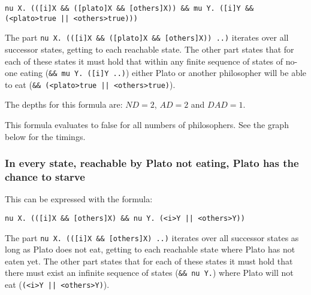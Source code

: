 \documentclass[10pt,a4paper]{article}
\begin{document}
\begin{center}
	\tt nu X. (([i]X \&\& ([plato]X \&\& [others]X)) \&\& mu Y. ([i]Y \&\& (<plato>true || <others>true)))
\end{center}	
	
The part {\tt nu X. (([i]X \&\& ([plato]X \&\& [others]X)) ..)} iterates over all successor states, getting to each reachable state. The other part states that for each of these states it must hold that within any finite sequence of states of no-one eating ({\tt \&\& mu Y. ([i]Y ..)}) either Plato or another philosopher will be able to eat ({\tt \&\& (<plato>true || <others>true)}).

The depths for this formula are: $ND = 2$, $AD = 2$ and $DAD = 1$.

This formula evaluates to false for all numbers of philosophers. See the graph below for the timings.


\subsubsection{In every state, reachable by Plato not eating, Plato has the chance to starve}
This can be expressed with the formula:

\begin{center}
	{\tt nu X. (([i]X \&\& [others]X) \&\& nu Y. (<i>Y || <others>Y))}
\end{center}

The part {\tt nu X. (([i]X \&\& [others]X) ..)} iterates over all successor states as long as Plato does not eat, getting to each reachable state where Plato has not eaten yet. The other part states that for each of these states it must hold that there must exist an infinite sequence of states ({\tt \&\& nu Y.}) where Plato will not eat ({\tt (<i>Y || <others>Y)}).
\end{document}
